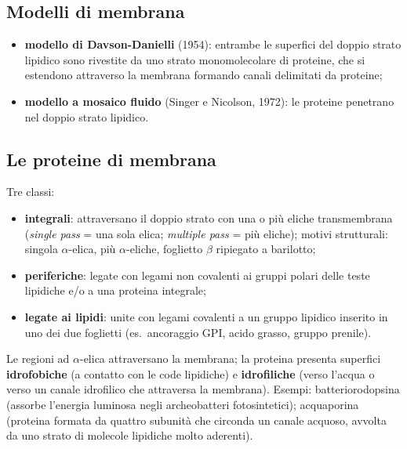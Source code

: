 \subsection{Modelli di membrana}

\begin{itemize}
  \item \textbf{modello di Davson-Danielli} (1954): entrambe le superfici del doppio strato lipidico sono rivestite da uno strato monomolecolare di proteine, che si estendono attraverso la membrana formando canali delimitati da proteine;
  \item \textbf{modello a mosaico fluido} (Singer e Nicolson, 1972): le proteine penetrano nel doppio strato lipidico.
\end{itemize}

\subsection{Le proteine di membrana}

Tre classi:
\begin{itemize}
  \item \textbf{integrali}: attraversano il doppio strato con una o più eliche transmembrana (\textit{single pass} = una sola elica; \textit{multiple pass} = più eliche); motivi strutturali: singola $\alpha$-elica, più $\alpha$-eliche, foglietto $\beta$ ripiegato a barilotto;
  \item \textbf{periferiche}: legate con legami non covalenti ai gruppi polari delle teste lipidiche e/o a una proteina integrale;
  \item \textbf{legate ai lipidi}: unite con legami covalenti a un gruppo lipidico inserito in uno dei due foglietti (es.\ ancoraggio GPI, acido grasso, gruppo prenile).
\end{itemize}

Le regioni ad $\alpha$-elica attraversano la membrana; la proteina presenta superfici \textbf{idrofobiche} (a contatto con le code lipidiche) e \textbf{idrofiliche} (verso l'acqua o verso un canale idrofilico che attraversa la membrana). Esempi: batteriorodopsina (assorbe l'energia luminosa negli archeobatteri fotosintetici); acquaporina (proteina formata da quattro subunità che circonda un canale acquoso, avvolta da uno strato di molecole lipidiche molto aderenti).

